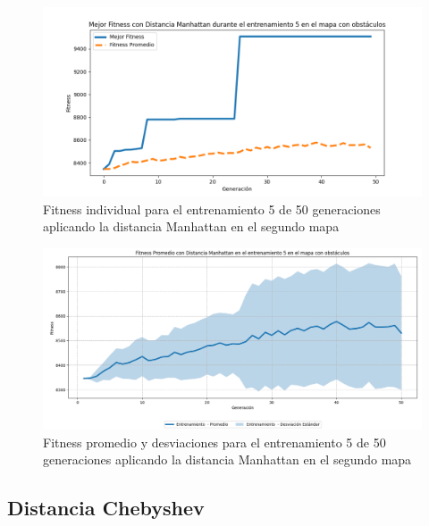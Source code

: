 \documentclass[lettersize, journal]{IEEEtran}
\begin{document}
\begin{figure}[H]
    \centering
    \includegraphics[width=0.9 \linewidth]{Manhattan/Mapa2/Fitness_5_Map2_Manh_50Gen.png}
    \caption{Fitness individual para el entrenamiento 5 de 50 generaciones aplicando la distancia Manhattan en el segundo mapa}
    \label{fig:manh_5_50_m2}
\end{figure}
\begin{figure}[H]
    \centering
    \includegraphics[width=0.9 \linewidth]{Manhattan/Mapa2/Fitness_5_Map2_Manh_50Gen_Sombra.png}
    \caption{Fitness promedio y desviaciones para el entrenamiento 5 de 50 generaciones aplicando la distancia Manhattan en el segundo mapa}
    \label{fig:manh_5_50_sombra_m2}
\end{figure}

\subsection{Distancia Chebyshev}
\setcounter{figure}{0}
\renewcommand{\thefigure}{S\arabic{figure}-CM2}
\end{document}
